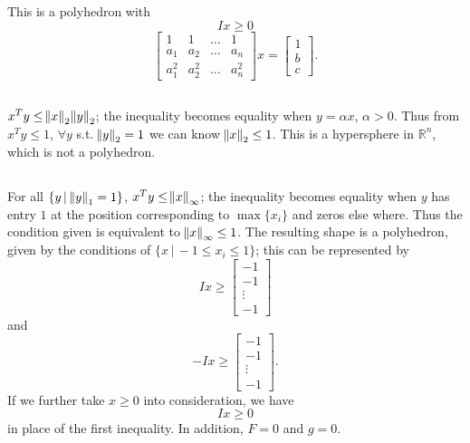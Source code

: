 \documentclass[11pt]{article}
\begin{document}
\maketitle
\section{}
\subsection{}
This is a polyhedron with $$Ix\geq0 $$ $$\begin{bmatrix} 1 & 1 & \dots &1\\a_1 & a_2 & \dots&a_n\\a_1^2&a_2^2&\dots&a_n^2 \end{bmatrix}x=\begin{bmatrix}1\\b\\c \end{bmatrix}.$$
\subsection{}
$x^Ty\leq\norm{x}_2\norm{y}_2$; the inequality becomes equality when $y=\alpha x$, $\alpha > 0$. Thus from $x^Ty\leq 1$, $\forall y$ s.t. $\norm{y}_2=1$ we can know $\norm{x}_2\leq1$. This is a hypersphere in $\mathbb{R}^n$, which is not a polyhedron.
\subsection{}
For all $\{y\, |\,\norm{y}_1=1\}$, $x^Ty\leq\norm{x}_\infty$; the inequality becomes equality when $y$ has entry $1$ at the position corresponding to $\max \{x_i\}$ and zeros else where. Thus the condition given is equivalent to $\norm{x}_\infty\leq1$. The resulting shape is a polyhedron, given by the conditions of $\{x\, |\, -1\leq x_i\leq1\}$; this can be represented by $$Ix\geq \begin{bmatrix} -1\\-1\\ \vdots \\-1\end{bmatrix}$$ and $$-Ix\geq \begin{bmatrix} -1\\-1\\ \vdots \\-1\end{bmatrix}.$$ If we further take $x\geq0$ into consideration, we have $$Ix\geq0$$ in place of the first inequality. In addition, $F=0$ and $g=0$.
\end{document}
